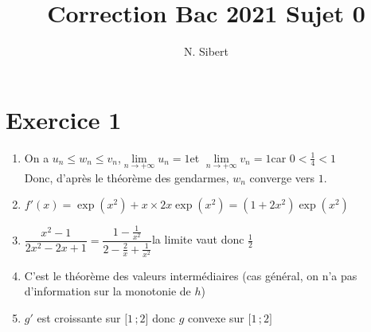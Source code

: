 \documentclass{scrartcl}
\title{Correction Bac 2021 Sujet 0}
\author{N. Sibert}
\begin{document}
    \maketitle

    \section*{Exercice 1}
    \begin{adjustwidth}{2em}{0pt}
        \begin{enumerate}
            \item {}\par 
            On a $u_n\leq w_n\leq v_n$,\quad$\lim\limits_{n\to +\infty}u_n=1$\quad et \quad$\lim\limits_{n\to +\infty}v_n=1$\quad car $0<\frac{1}{4}<1$ \\ Donc, d'après le théorème des gendarmes, $w_n$ converge vers $1$.            
            \item {}\par
            $f'(x)=\exp\left(x^2\right)+x\times 2x\exp\left(x^2\right)=\left(1+2x^2\right)\exp\left(x^2\right)$
            \item {}\par
            $\dfrac{x^2-1}{2x^2-2x+1}=\dfrac{1-\frac{1}{x^2}}{2-\frac{2}{x}+\frac{1}{x^2}}$\quad la limite vaut donc $\frac{1}{2}$
            \item {}\par
            C'est le théorème des valeurs intermédiaires (cas général, on n'a pas d'information sur la monotonie de $h$)
            \item {}\par
            $g'$ est croissante sur $\big[1\,;2\big]$ donc $g$ convexe sur $\big[1\,;2\big]$
        \end{enumerate}
    \end{adjustwidth}
    
\pagebreak    
    
\end{document}
